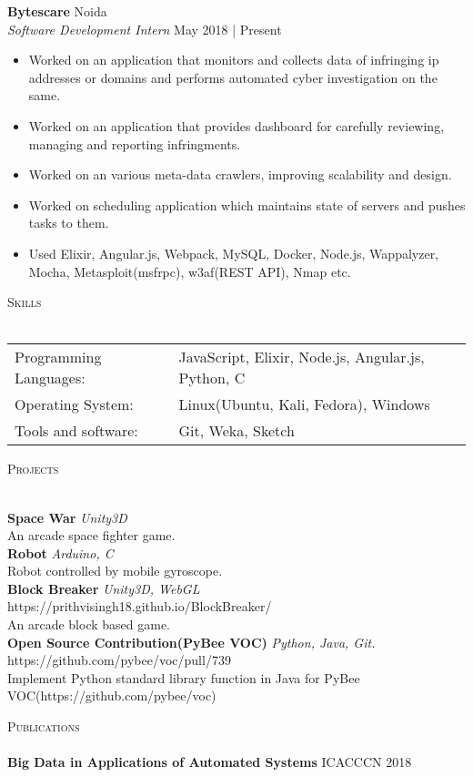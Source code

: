 \documentclass[a4paper]{article}
\newcommand{\lineunder} {
    \vspace*{-8pt} \\
    \hspace*{-18pt} \hrulefill \\
}
\newcommand{\header} [1] {
    {\hspace*{-18pt}\vspace*{6pt} \textsc{#1}}
    \vspace*{-6pt} \lineunder
}
\begin{document}
\textbf{Bytescare} \hfill Noida\\
\textit{Software Development Intern} \hfill May 2018 | Present\\
\vspace{-1mm}
\begin{itemize} \itemsep 1pt
	\item Worked on an application that monitors and collects data of infringing ip addresses or domains and performs automated cyber investigation on the same.
	\item Worked on an application that provides dashboard for carefully reviewing, managing and reporting infringments. 
  \item Worked on an various meta-data crawlers, improving scalability and design.
  \item Worked on scheduling application which maintains state of servers and pushes tasks to them. 
	\item Used Elixir, Angular.js, Webpack, MySQL, Docker, Node.js, Wappalyzer, Mocha, Metasploit(msfrpc), w3af(REST API), Nmap etc.
\end{itemize}

\header{Skills}
\begin{tabular}{ l l }
	Programming Languages: & JavaScript, Elixir, Node.js, Angular.js, Python, C\\
	Operating System:      & Linux(Ubuntu, Kali, Fedora), Windows                                              \\
	Tools and software:    & Git, Weka, Sketch                                                                 \\
\end{tabular}
\vspace{2mm}

\header{Projects}
\vspace{1mm}

{\textbf{Space War}} {\sl Unity3D} \\
An arcade space fighter game.\\
\vspace*{2mm}
{\textbf{Robot}} {\sl Arduino, C} \\
Robot controlled by mobile gyroscope.\\
\vspace*{2mm}
{\textbf{Block Breaker}} {\sl Unity3D, WebGL} \hfill https://prithvisingh18.github.io/BlockBreaker/\\
An arcade block based game.\\
\vspace*{2mm}
{\textbf{Open Source Contribution(PyBee VOC)}} {\sl Python, Java, Git.} \hfill https://github.com/pybee/voc/pull/739\\
Implement Python standard library function in Java for PyBee VOC(https://github.com/pybee/voc)\\
\vspace*{2mm}

\header{Publications}
\textbf{Big Data in Applications of Automated Systems} \hfill ICACCCN 2018\\

\vspace*{2mm}

\ 
\end{document}
